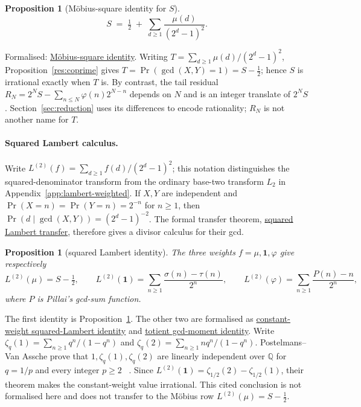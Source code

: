 \documentclass[11pt]{article}
\newcommand{\commit}{bb4e24651b37cd096d3749ef299c3317930b3a3b}
\newcommand{\repobase}{https://github.com/wcook04/plectis-lean-erdos249-257/blob/\commit}
\newcommand{\PK}{Erdos249257}
\newcommand{\lword}[4]{\href{\repobase/\PK/#1\#L#2}{#4}}
\newtheorem{proposition}[theorem]{Proposition}
\theoremstyle{definition}
\theoremstyle{remark}
\newcommand{\Q}{\mathbb{Q}}
\newcommand{\ph}{\varphi}
\begin{document}
{\begin{proposition}[M\"obius-square identity for \(S\)]\label{res:lens}
\[
S \;=\; \tfrac12 \;+\; \sum_{d\ge1}\frac{\mu(d)}{(2^d-1)^2}.
\]
\end{proposition}
\noindent Formalised: \lword{CertificateKernel.lean}{18454}{totient_series_eq_half_add_moebius_mersenne_square}{M\"obius-square identity}.
Writing \(T=\sum_{d\ge1}\mu(d)/(2^d-1)^2\), Proposition~\ref{res:coprime}
gives \(T=\Pr(\gcd(X,Y)=1)=S-\tfrac12\); hence $S$ is irrational exactly
when $T$ is.  By contrast, the tail residual
\(R_N=2^NS-\sum_{n\le N}\ph(n)2^{N-n}\) depends on $N$ and is an integer
translate of $2^NS$.  Section~\ref{sec:reduction} uses its differences to
encode rationality; $R_N$ is not another name for $T$.

\paragraph{Squared Lambert calculus.}\label{sec:squared}
Write \(L^{(2)}(f)=\sum_{d\ge1}f(d)/(2^d-1)^2\); this notation distinguishes
the squared-denominator transform from the ordinary base-two transform $L_2$
in Appendix~\ref{app:lambert-weighted}.  If $X,Y$ are independent and
$\Pr(X=n)=\Pr(Y=n)=2^{-n}$ for $n\ge1$, then
$\Pr(d\mid\gcd(X,Y))=(2^d-1)^{-2}$.  The formal transfer theorem,
\lword{GcdMomentCalculus.lean}{105}{tsum_lambert_linear_weight_sq_pure}{squared Lambert transfer},
therefore gives a divisor calculus for their gcd.
\begin{proposition}[squared Lambert identity]\label{res:gcdmoment}
The three weights \(f=\mu,\mathbf 1,\ph\) give respectively
\[
 L^{(2)}(\mu)=S-\tfrac12,\qquad
 L^{(2)}(\mathbf 1)=\sum_{n\ge1}\frac{\sigma(n)-\tau(n)}{2^n},\qquad
 L^{(2)}(\ph)=\sum_{n\ge1}\frac{P(n)-n}{2^n},
\]
where \(P\) is Pillai's gcd-sum function.
\end{proposition}
\noindent The first identity is Proposition~\ref{res:lens}.  The other two are
formalised as \lword{GcdMomentCalculus.lean}{216}{tsum_one_div_mersenne_sq_eq_sigma_sub_tau_series}{constant-weight squared-Lambert identity} and
\lword{GcdMomentCalculus.lean}{235}{tsum_totient_div_mersenne_sq_eq_gcd_moment_series}{totient gcd-moment identity}.
Write
\(\zeta_q(1)=\sum_{n\ge1}q^n/(1-q^n)\) and
\(\zeta_q(2)=\sum_{n\ge1}nq^n/(1-q^n)\).
Postelmans--Van Assche prove that \(1,\zeta_q(1),\zeta_q(2)\) are linearly
independent over \(\Q\) for $q=1/p$ and every integer $p\ge2$
~\cite[Theorem~1.3 in the published version; Theorem~3 on p.~4 and proof in
Section~7, pp.~30--34, of the linked preprint]{postelmansvanassche}.  Since
$L^{(2)}(\mathbf1)=\zeta_{1/2}(2)-\zeta_{1/2}(1)$, their theorem makes the
constant-weight value irrational.  This cited conclusion is not formalised
here and does not transfer to the M\"obius row $L^{(2)}(\mu)=S-\tfrac12$.

}
\end{document}
